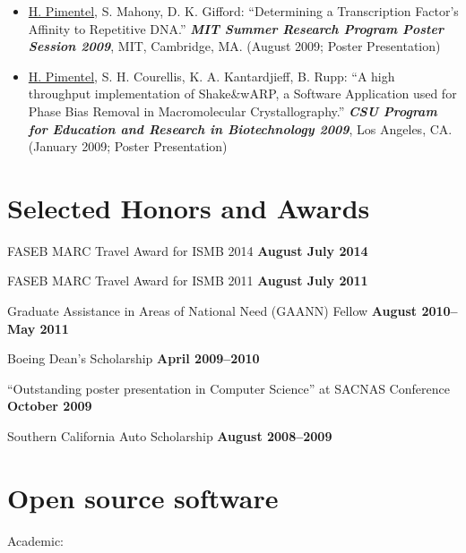 \documentclass[11pt,notitlepage]{article} %
\begin{document}
\begin{itemize}
  \item \underline{H. Pimentel}, S. Mahony, D. K. Gifford: ``Determining a
Transcription Factor's Affinity to Repetitive DNA.'' {\bf \emph{MIT
    Summer Research Program Poster Session 2009}}, MIT, Cambridge,
MA. (August 2009; Poster Presentation)


\item \underline{H. Pimentel}, S. H. Courellis, K. A. Kantardjieff, B. Rupp:
``A high throughput implementation of Shake\&wARP, a Software
Application used for Phase Bias Removal in Macromolecular
Crystallography.'' {\bf \emph{CSU Program for Education and Research
   in Biotechnology 2009}}, Los Angeles, CA. (January 2009; Poster Presentation)
 \end{itemize}

  \bigskip
\section*{Selected Honors and Awards}
\medskip

FASEB MARC Travel Award for ISMB 2014 \hfill {\bf August
  July 2014}

\medskip
FASEB MARC Travel Award for ISMB 2011 \hfill {\bf August
  July 2011}

\medskip
Graduate Assistance in Areas of National Need (GAANN) Fellow \hfill {\bf August
  2010--May 2011}

\medskip
Boeing Dean's Scholarship \hfill {\bf April 2009--2010}

\medskip
``Outstanding poster presentation in Computer Science'' at SACNAS
Conference \hfill {\bf October 2009}

\medskip
Southern California Auto Scholarship \hfill {\bf August 2008--2009}


\bigskip
\section*{Open source software}

\medskip
Academic:
\end{document}
